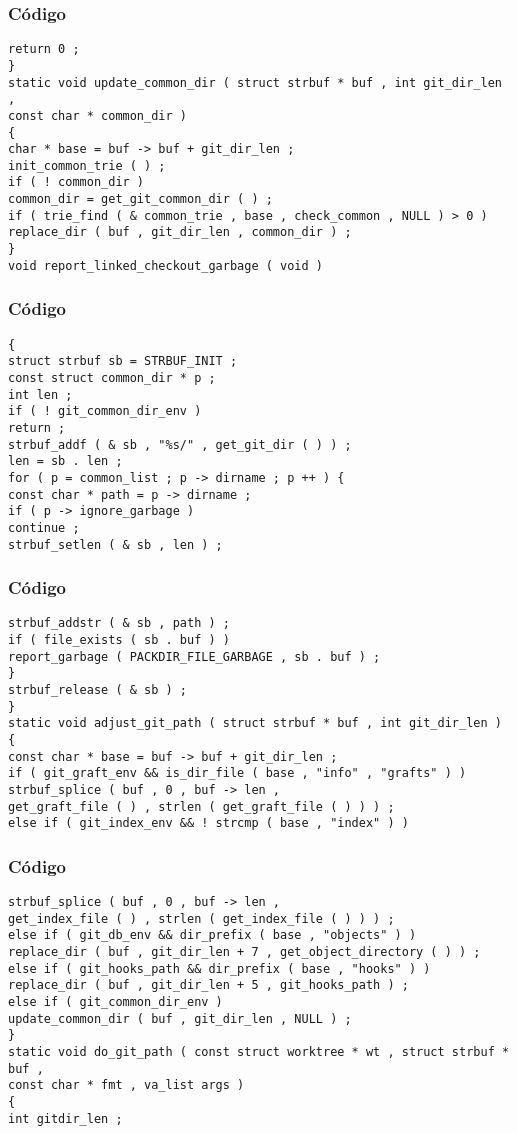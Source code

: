 \documentclass{beamer}
\begin{document}
\begin{frame}[fragile]
\frametitle{C\'odigo}
\begin{verbatim}
return 0 ; 
} 
static void update_common_dir ( struct strbuf * buf , int git_dir_len , 
const char * common_dir ) 
{ 
char * base = buf -> buf + git_dir_len ; 
init_common_trie ( ) ; 
if ( ! common_dir ) 
common_dir = get_git_common_dir ( ) ; 
if ( trie_find ( & common_trie , base , check_common , NULL ) > 0 ) 
replace_dir ( buf , git_dir_len , common_dir ) ; 
} 
void report_linked_checkout_garbage ( void ) 
\end{verbatim}
\end{frame}
\begin{frame}[fragile]
\frametitle{C\'odigo}
\begin{verbatim}
{ 
struct strbuf sb = STRBUF_INIT ; 
const struct common_dir * p ; 
int len ; 
if ( ! git_common_dir_env ) 
return ; 
strbuf_addf ( & sb , "%s/" , get_git_dir ( ) ) ; 
len = sb . len ; 
for ( p = common_list ; p -> dirname ; p ++ ) { 
const char * path = p -> dirname ; 
if ( p -> ignore_garbage ) 
continue ; 
strbuf_setlen ( & sb , len ) ; 
\end{verbatim}
\end{frame}
\begin{frame}[fragile]
\frametitle{C\'odigo}
\begin{verbatim}
strbuf_addstr ( & sb , path ) ; 
if ( file_exists ( sb . buf ) ) 
report_garbage ( PACKDIR_FILE_GARBAGE , sb . buf ) ; 
} 
strbuf_release ( & sb ) ; 
} 
static void adjust_git_path ( struct strbuf * buf , int git_dir_len ) 
{ 
const char * base = buf -> buf + git_dir_len ; 
if ( git_graft_env && is_dir_file ( base , "info" , "grafts" ) ) 
strbuf_splice ( buf , 0 , buf -> len , 
get_graft_file ( ) , strlen ( get_graft_file ( ) ) ) ; 
else if ( git_index_env && ! strcmp ( base , "index" ) ) 
\end{verbatim}
\end{frame}
\begin{frame}[fragile]
\frametitle{C\'odigo}
\begin{verbatim}
strbuf_splice ( buf , 0 , buf -> len , 
get_index_file ( ) , strlen ( get_index_file ( ) ) ) ; 
else if ( git_db_env && dir_prefix ( base , "objects" ) ) 
replace_dir ( buf , git_dir_len + 7 , get_object_directory ( ) ) ; 
else if ( git_hooks_path && dir_prefix ( base , "hooks" ) ) 
replace_dir ( buf , git_dir_len + 5 , git_hooks_path ) ; 
else if ( git_common_dir_env ) 
update_common_dir ( buf , git_dir_len , NULL ) ; 
} 
static void do_git_path ( const struct worktree * wt , struct strbuf * buf , 
const char * fmt , va_list args ) 
{ 
int gitdir_len ; 
\end{verbatim}
\end{frame}
\end{document}

